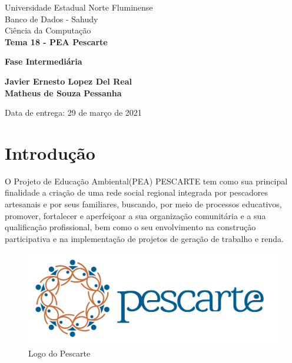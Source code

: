 \documentclass[11pt]{../../classes/ifscarticle}
\begin{document}
\begin{center}

    {\large Universidade Estadual Norte Fluminense}\\[0.2cm] %
    {\large Banco de Dados - Sahudy }\\[0.2cm] %
    {\large Ciência da Computação}\\[5.2cm]


    {\Huge \bfseries Tema 18 - PEA Pescarte}

    \vspace{.5cm}

    {\LARGE \bfseries Fase Intermediária}

    \vfill
\end{center}
\begin{tabbing}

\end{tabbing}

{\noindent \large \bfseries
Javier Ernesto Lopez Del Real
\\[.5em] Matheus de Souza Pessanha
}


\begin{flushright}
    Data de entrega: 29 de mar\c{c}o de 2021
\end{flushright}

\clearpage
\pagestyle{firstpage}


\tableofcontents
\clearpage


\section{Introdução}
\label{sec:introducao}

O Projeto de Educação Ambiental(PEA) PESCARTE tem como sua principal finalidade a criação de uma rede social regional integrada por pescadores artesanais e por seus familiares, buscando, por meio de processos educativos, promover, fortalecer e aperfeiçoar a sua organização comunitária e a sua qualificação profissional, bem como o seu envolvimento na construção participativa e na implementação de projetos de geração de trabalho e renda.
\begin{figure}[ht]
    \centering
    \includegraphics[width=.5\linewidth]{figuras/logoPescarte}
    \caption{Logo do Pescarte}
    \label{fig:logolatex}
\end{figure}
\end{document}
